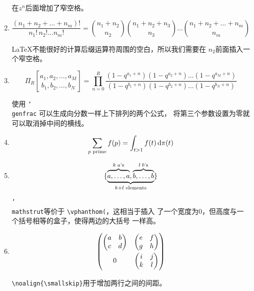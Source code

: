 \documentclass[UTF8,a4paper,scheme=plain,%
punct=quanjiao]{ctexart}
\newcommand*{\cmd}[1]{\texttt{\char`\\#1}}
\begin{document}
\begin{enumerate}[label=Challenge \arabic*]
  \index{\cmd{Bigg}!\cmd{Biggl}}
  \index{\cmd{Bigg}!\cmd{Biggr}}

  在\(z^n\)后面增加了窄空格。
\item
  \[\frac{(n_1+n_2+\dots+n_m)!}{n_1!\,n_2!\dots
      n_m!}=\binom{n_1+n_2}{n_2}\binom{n_1+n_2+n_3}{n_3}\dots\binom{n_1+n_2+\dots+n_m}{n_m}
  \]

  \LaTeX 不能很好的计算后缀运算符周围的空白，所以我们需要在
  \(n_2\)前面插入一个窄空格。

\item
  \[\Pi_R\genfrac[]{0pt}{}
      {a_1,a_2,\dots,a_M}
      {b_1,b_2,\dots,b_N}
    =\prod_{n=0}^R\frac{
      (1-q^{a_1+n})(1-q^{a_2+n})\dots(1-q^{a_M+n})}{
      (1-q^{b_1+n})(1-q^{b_2+n})\dots(1-q^{b_N+n})}
  \]

  使用 \cmd{genfrac} 可以生成向分数一样上下排列的两个公式，
  将第三个参数设置为零就可以取消掉中间的横线。

  \index{\cmd{genfrac}}

\item
  \[\sum_{p\textrm{ prime}}f(p)=\int_{t>1}f(t)\operatorname{d\!}\pi(t)\]

\item
  \[\{\underbrace{\overbrace{\mathstrut a,\dots,a}^{k\;a\textrm{'s}},
      \overbrace{\mathstrut b,\dots,b}^{l\;b\textrm{'s}}
    }_{k+l\textrm{ elements}}\}
  \]

  \cmd{mathstrut}等价于 \verb|\vphanthom(|，这相当于插入
  了一个宽度为0，但高度与一个括号相等的盒子，使得两边的大括号
  一样高。

  \index{\cmd{mathstrut}}
  
\item
  \[\begin{pmatrix}
      \begin{pmatrix}a&b\\c&d\end{pmatrix} &
      \begin{pmatrix}e&f\\g&h\end{pmatrix} \\
      \noalign{\smallskip} 0 &
      \begin{pmatrix}i&j\\k&l\end{pmatrix}
    \end{pmatrix}
  \]

  \verb|\noalign{\smallskip}|用于增加两行之间的间距。

  \index{\cmd{noalign}\{\cmd{smallskip}\}}


\end{enumerate}
\end{document}
